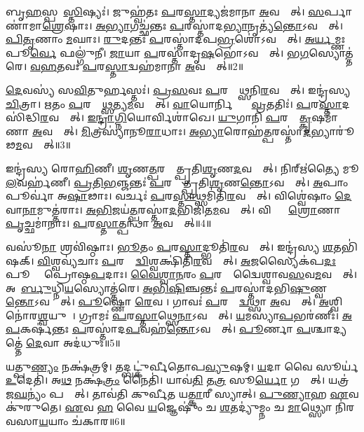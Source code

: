 𑌬𑍃\ul{𑌹}𑌸𑍍𑌪𑌤𑍇᳚\ul{𑌸𑍍𑌤𑌿}𑌷𑍍𑌯𑌃॑।
𑌜𑍁𑌹𑍍𑌵॑𑌤𑌃 \ul{𑌪}𑌰\ul{𑌸𑍍𑌤𑌾}𑌦𑍍𑌯𑌜॑𑌮𑌾𑌨𑌾 \ul{𑌅}𑌵𑌸𑍍𑌤𑌾᳚𑌤𑍍।
\ul{𑌸}𑌰𑍍𑌪𑌾𑌣𑌾॑𑌮𑌾\ul{𑌶𑍍𑌰𑍇}𑌷𑌾𑌃।
\ul{𑌅}\ul{𑌭𑍍𑌯𑌾}𑌗𑌚𑍍𑌛॑𑌨𑍍𑌤𑌃 \ul{𑌪}𑌰𑌸𑍍𑌤𑌾॑𑌦\ul{𑌭𑍍𑌯𑌾}𑌨𑍃𑌤𑍍𑌯॑\ul{𑌨𑍍𑌤𑍋}\-𑌽𑌵𑌸𑍍𑌤𑌾᳚𑌤𑍍।
\ul{𑌪𑌿}\ul{𑌤𑍃}𑌣𑌾𑌂 \ul{𑌮}𑌘𑌾𑌃।
\ul{𑌰𑍁}𑌦𑌨𑍍𑌤𑌃॑ \ul{𑌪}𑌰𑌸𑍍𑌤𑌾॑𑌦𑌪\ul{𑌭𑍍𑌰}\ul{}𑌶𑍋॑\-𑌽𑌵𑌸𑍍𑌤𑌾᳚𑌤𑍍।
\ul{𑌅}\ul{𑌰𑍍𑌯}𑌮𑍍𑌣𑌃 𑌪𑍂\ul{𑌰𑍍𑌵𑍇} 𑌫𑌲𑍍𑌗𑍁॑𑌨𑍀।
\ul{𑌜𑌾}𑌯𑌾 \ul{𑌪}𑌰𑌸𑍍𑌤𑌾॑𑌦𑍃\ul{𑌷}𑌭𑍋॑\-𑌽𑌵𑌸𑍍𑌤𑌾᳚𑌤𑍍।
𑌭\ul{𑌗}𑌸𑍍𑌯𑍋𑌤𑍍𑌤॑𑌰𑍇।
\ul{𑌵}\ul{𑌹}𑌤𑌵𑌃॑ \ul{𑌪}𑌰\ul{𑌸𑍍𑌤𑌾}𑌦𑍍𑌵𑌹॑𑌮𑌾𑌨𑌾 \ul{𑌅}𑌵𑌸𑍍𑌤𑌾᳚𑌤𑍍॥2॥

\ul{𑌦𑍇}𑌵𑌸𑍍𑌯॑ 𑌸\ul{𑌵𑌿}𑌤𑍁𑌰𑍍\mbox{}𑌹𑌸𑍍𑌤𑌃॑।
\ul{𑌪𑍍𑌰}\ul{𑌸}𑌵𑌃 \ul{𑌪}𑌰𑌸𑍍𑌤𑌾᳚\ul{𑌥𑍍𑌸}𑌨𑌿\ul{𑌰}𑌵𑌸𑍍𑌤𑌾᳚𑌤𑍍।
𑌇𑌨𑍍𑌦𑍍𑌰॑𑌸𑍍𑌯 \ul{𑌚𑌿}𑌤𑍍𑌰𑌾।
\ul{𑌋}𑌤𑌂 \ul{𑌪}𑌰𑌸𑍍𑌤𑌾᳚\ul{𑌥𑍍𑌸}𑌤𑍍𑌯\ul{𑌮}𑌵𑌸𑍍𑌤𑌾᳚𑌤𑍍।
\ul{𑌵𑌾}𑌯𑍋𑌰𑍍𑌨𑌿𑌷𑍍𑌟𑍍𑌯𑌾᳚ \ul{𑌵𑍍𑌰}𑌤𑌤𑌿𑌃॑।
\ul{𑌪}𑌰\ul{𑌸𑍍𑌤𑌾}𑌦𑌸𑌿॑𑌦𑍍𑌧𑌿\ul{𑌰}𑌵𑌸𑍍𑌤𑌾᳚𑌤𑍍।
\ul{𑌇}\ul{𑌨𑍍𑌦𑍍𑌰𑌾}\ul{𑌗𑍍𑌨𑌿}𑌯𑍋𑌰𑍍𑌵𑌿𑌶𑌾॑𑌖𑍇।
\ul{𑌯𑍁}𑌗𑌾𑌨𑌿॑ \ul{𑌪}𑌰𑌸𑍍𑌤𑌾᳚\ul{𑌤𑍍𑌕𑍃}𑌷𑌮𑌾॑𑌣𑌾 \ul{𑌅}𑌵𑌸𑍍𑌤𑌾᳚𑌤𑍍।
\ul{𑌮𑌿}𑌤𑍍𑌰𑌸𑍍𑌯𑌾॑𑌨𑍂\ul{𑌰𑌾}𑌧𑌾𑌃।
\ul{𑌅}\ul{𑌭𑍍𑌯𑌾}𑌰𑍋𑌹॑\ul{𑌤𑍍𑌪}𑌰𑌸𑍍𑌤𑌾॑\ul{𑌦}𑌭𑍍𑌯𑌾𑌰𑍂॑𑌢\ul{𑌮}𑌵𑌸𑍍𑌤𑌾᳚𑌤𑍍॥3॥

𑌇𑌨𑍍𑌦𑍍𑌰॑𑌸𑍍𑌯 𑌰𑍋\ul{𑌹𑌿}𑌣𑍀।
\ul{𑌶𑍃}𑌣\ul{𑌤𑍍𑌪}𑌰𑌸𑍍𑌤𑌾᳚𑌤𑍍𑌪𑍍𑌰𑌤𑌿\ul{𑌶𑍃}𑌣\ul{𑌦}𑌵𑌸𑍍𑌤𑌾᳚𑌤𑍍।
𑌨𑌿𑌰𑍍\mbox{}𑌋॑𑌤𑍍𑌯𑍈 𑌮𑍂\ul{𑌲}𑌵𑌰𑍍\mbox{}𑌹॑𑌣𑍀।
\ul{𑌪𑍍𑌰}\ul{𑌤𑌿}\ul{𑌭}𑌞𑍍𑌜𑌨𑍍𑌤𑌃॑ \ul{𑌪}𑌰𑌸𑍍𑌤𑌾᳚𑌤𑍍𑌪𑍍𑌰𑌤𑌿\ul{𑌶𑍃}𑌣\ul{𑌨𑍍𑌤𑍋}\-𑌽𑌵𑌸𑍍𑌤𑌾᳚𑌤𑍍।
\ul{𑌅}𑌪𑌾𑌂 𑌪𑍂𑌰𑍍𑌵𑌾॑ 𑌅\ul{𑌷𑌾}𑌢𑌾𑌃।
𑌵𑌰𑍍𑌚𑌃॑ \ul{𑌪}𑌰\ul{𑌸𑍍𑌤𑌾}𑌥𑍍𑌸𑌮𑌿॑𑌤𑌿\ul{𑌰}𑌵𑌸𑍍𑌤𑌾᳚𑌤𑍍।
𑌵𑌿𑌶𑍍𑌵𑍇॑𑌷𑌾𑌂 \ul{𑌦𑍇}𑌵𑌾\ul{𑌨𑌾}𑌮𑍁𑌤𑍍𑌤॑𑌰𑌾𑌃।
\ul{𑌅}\ul{𑌭𑌿}𑌜𑌯॑\ul{𑌤𑍍𑌪}𑌰𑌸𑍍𑌤𑌾॑\ul{𑌦}𑌭𑌿𑌜𑌿॑𑌤\ul{𑌮}𑌵𑌸𑍍𑌤𑌾᳚𑌤𑍍।
𑌵𑌿𑌷𑍍𑌣𑍋𑌃᳚ \ul{𑌶𑍍𑌰𑍋}𑌣𑌾 \ul{𑌪𑍃}𑌚𑍍𑌛𑌮𑌾॑𑌨𑌾𑌃।
\ul{𑌪}𑌰\ul{𑌸𑍍𑌤𑌾}𑌤𑍍𑌪𑌨𑍍𑌥𑌾॑ \ul{𑌅}𑌵𑌸𑍍𑌤𑌾᳚𑌤𑍍॥4॥

𑌵𑌸𑍂॑\ul{𑌨𑌾}\ul{} 𑌶𑍍𑌰𑌵𑌿॑𑌷𑍍𑌠𑌾𑌃।
\ul{𑌭𑍂}𑌤𑌂 \ul{𑌪}𑌰\ul{𑌸𑍍𑌤𑌾}𑌦𑍍𑌭𑍂𑌤𑌿॑\ul{𑌰}𑌵𑌸𑍍𑌤𑌾᳚𑌤𑍍।
𑌇𑌨𑍍𑌦𑍍𑌰॑𑌸𑍍𑌯 \ul{𑌶}𑌤𑌭𑌿॑𑌷𑌕𑍍।
\ul{𑌵𑌿}𑌶𑍍𑌵𑌵𑍍𑌯॑𑌚𑌾𑌃 \ul{𑌪}𑌰𑌸𑍍𑌤𑌾᳚\ul{𑌦𑍍𑌵𑌿}𑌶𑍍𑌵𑌕𑍍𑌷𑌿॑𑌤𑌿\ul{𑌰}𑌵𑌸𑍍𑌤𑌾᳚𑌤𑍍।
\ul{𑌅}𑌜𑌸𑍍𑌯𑍈𑌕॑𑌪\ul{𑌦𑌃} 𑌪𑍂𑌰𑍍𑌵𑍇᳚ 𑌪𑍍𑌰𑍋𑌷𑍍𑌠\ul{𑌪}𑌦𑌾𑌃।
\ul{𑌵𑍈}\ul{𑌶𑍍𑌵𑌾}\ul{𑌨}𑌰𑌂 \ul{𑌪}𑌰𑌸𑍍𑌤𑌾᳚𑌦𑍍𑌵𑍈𑌶𑍍𑌵𑌾𑌵\ul{𑌸}𑌵\ul{𑌮}\-𑌵𑌸𑍍𑌤𑌾᳚𑌤𑍍।
𑌅𑌹𑍇᳚\ul{𑌰𑍍𑌬𑍁}𑌧𑍍𑌨𑌿\ul{𑌯}𑌸𑍍𑌯𑍋𑌤𑍍𑌤॑𑌰𑍇।
\ul{𑌅}\ul{𑌭𑌿}\ul{𑌷𑌿}𑌞𑍍𑌚𑌨𑍍𑌤𑌃॑ \ul{𑌪}𑌰𑌸𑍍𑌤𑌾॑𑌦𑌭𑌿\-\ul{𑌷𑍁}𑌣𑍍𑌵\ul{𑌨𑍍𑌤𑍋}\-𑌽𑌵𑌸𑍍𑌤𑌾᳚𑌤𑍍।
\ul{𑌪𑍂}𑌷𑍍𑌣𑍋 \ul{𑌰𑍇}𑌵𑌤𑍀᳚।
𑌗𑌾𑌵𑌃॑ \ul{𑌪}𑌰𑌸𑍍𑌤𑌾᳚\ul{𑌦𑍍𑌵}𑌥𑍍𑌸𑌾 \ul{𑌅}𑌵𑌸𑍍𑌤𑌾᳚𑌤𑍍।
\ul{𑌅}𑌶𑍍𑌵𑌿𑌨𑍋॑𑌰\ul{𑌶𑍍𑌵}𑌯𑍁𑌜𑍗᳚।
𑌗𑍍𑌰𑌾𑌮𑌃॑ \ul{𑌪}𑌰\ul{𑌸𑍍𑌤𑌾}𑌥𑍍𑌸𑍇\ul{𑌨𑌾}\-𑌽𑌵𑌸𑍍𑌤𑌾᳚𑌤𑍍।
\ul{𑌯}𑌮𑌸𑍍𑌯𑌾॑\ul{𑌪}𑌭𑌰॑𑌣𑍀𑌃।
\ul{𑌅}\ul{𑌪}𑌕𑌰𑍍\mbox{}𑌷॑𑌨𑍍𑌤𑌃 \ul{𑌪}𑌰𑌸𑍍𑌤𑌾॑𑌦\ul{𑌪}𑌵𑌹॑\ul{𑌨𑍍𑌤𑍋}\-𑌽𑌵𑌸𑍍𑌤𑌾᳚𑌤𑍍।
\ul{𑌪𑍂}𑌰𑍍𑌣𑌾 \ul{𑌪}𑌶𑍍𑌚𑌾𑌦𑍍𑌯𑌤𑍍𑌤𑍇॑ \ul{𑌦𑍇}𑌵𑌾 𑌅𑌦॑𑌧𑍁𑌃॥5॥\anuvakamend[\ul{𑌆}𑌰𑍍𑌦𑍍𑌰\ul{𑌮}𑌵\ul{𑌸𑍍𑌤𑌾}𑌦𑍍𑌵𑌹॑𑌮𑌾𑌨𑌾 \ul{𑌅}𑌵𑌸𑍍𑌤𑌾॑\ul{𑌦}𑌭𑍍𑌯𑌾𑌰𑍂॑𑌢\ul{𑌮}𑌵\ul{𑌸𑍍𑌤𑌾}𑌤𑍍𑌪𑌨𑍍𑌥𑌾॑ \ul{𑌅}𑌵𑌸𑍍𑌤𑌾᳚\ul{𑌦𑍍𑌵}𑌥𑍍𑌸𑌾 \ul{𑌅}𑌵\ul{𑌸𑍍𑌤𑌾}𑌤𑍍𑌪𑌞𑍍𑌚॑ 𑌚]

𑌯𑌤𑍍𑌪𑍁\ul{𑌣𑍍𑌯𑌂} 𑌨𑌕𑍍𑌷॑𑌤𑍍𑌰𑌮𑍍।
𑌤𑌦𑍍𑌬𑌟𑍍𑌕𑍁॑𑌰𑍍𑌵𑍀𑌤𑍋𑌪\ul{𑌵𑍍𑌯𑍁}𑌷𑌮𑍍।
\ul{𑌯}𑌦𑌾 𑌵𑍈 𑌸𑍂𑌰𑍍𑌯॑ \ul{𑌉}𑌦𑍇𑌤𑌿॑।
𑌅\ul{𑌥} 𑌨𑌕𑍍𑌷॑\ul{𑌤𑍍𑌰𑌂} 𑌨𑍈𑌤𑌿॑।
𑌯𑌾𑌵॑\ul{𑌤𑌿} 𑌤\ul{𑌤𑍍𑌰} 𑌸𑍂\ul{𑌰𑍍𑌯𑍋} 𑌗𑌚𑍍𑌛𑍇᳚𑌤𑍍।
𑌯𑌤𑍍𑌰॑ 𑌜\ul{𑌘}𑌨𑍍𑌯𑌂॑ 𑌪𑌶𑍍𑌯𑍇᳚𑌤𑍍।
𑌤𑌾𑌵॑𑌤𑌿 𑌕𑍁𑌰𑍍𑌵𑍀𑌤 𑌯\ul{𑌤𑍍𑌕𑌾}𑌰𑍀 𑌸𑍍𑌯𑌾𑌤𑍍।
\ul{𑌪𑍁}\ul{𑌣𑍍𑌯𑌾}𑌹 \ul{𑌏}𑌵 𑌕𑍁॑𑌰𑍁𑌤𑍇।
\ul{𑌏}𑌵 \ul{𑌹} 𑌵𑍈 \ul{𑌯}𑌜𑍍𑌞𑍇𑌷𑍁𑌂॑ 𑌚 \ul{𑌶}𑌤𑌦𑍍𑌯𑍁॑𑌮𑍍𑌨𑌂 𑌚 \ul{𑌮𑌾}𑌥𑍍𑌸𑍍𑌯𑍋 𑌨𑌿॑𑌰𑌵𑌸𑌾\ul{𑌯}𑌯𑌾𑌂 𑌚॑𑌕𑌾𑌰॥6॥

